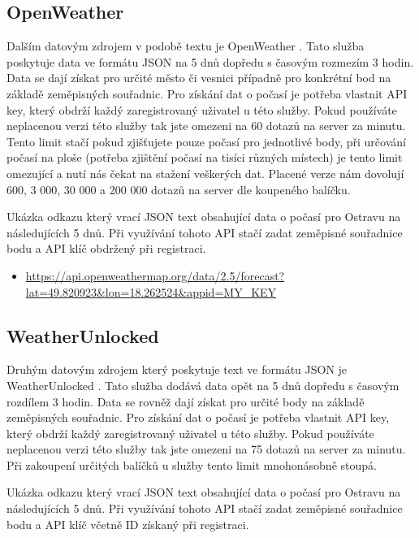 \documentclass[czech,bachelor,dept460,male,csharp,cpdeclaration]{diploma}
\begin{document}
	\subsection{OpenWeather}
	
	Dalším datovým zdrojem v podobě textu je OpenWeather \cite{owm}. Tato služba poskytuje data ve formátu JSON na 5 dnů dopředu s časovým rozmezím 3 hodin. Data se dají získat pro určité město či vesnici případně pro konkrétní bod na základě zeměpisných souřadnic. Pro získání dat o počasí je potřeba vlastnit API key, který obdrží každý zaregistrovaný uživatel u této služby. Pokud používáte neplacenou verzi této služby tak jste omezeni na 60 dotazů na server za minutu. Tento limit stačí pokud zjišťujete pouze počasí pro jednotlivé body, při určování počasí na ploše (potřeba zjištění počasí na tisíci různých místech) je tento limit omezující a nutí nás čekat na stažení veškerých dat. Placené verze nám dovolují 600, 3 000, 30 000 a 200 000 dotazů na server dle koupeného balíčku.
	
	Ukázka odkazu který vrací JSON text obsahující data o počasí pro Ostravu na následujících 5 dnů. Při využívání tohoto API stačí zadat zeměpisné souřadnice bodu a API klíč obdržený při registraci.
	
	\begin{itemize}
		\item \url{https://api.openweathermap.org/data/2.5/forecast?lat=49.820923\&lon=18.262524\&appid=MY\_KEY}
	\end{itemize}
	
	\subsection{WeatherUnlocked}
	
	Druhým datovým zdrojem který poskytuje text ve formátu JSON je WeatherUnlocked \cite{weun}. Tato služba dodává data opět na 5 dnů dopředu s časovým rozdílem 3 hodin. Data se rovněž dají získat pro určité body na základě zeměpisných souřadnic. Pro získání dat o počasí je potřeba vlastnit API key, který obdrží každý zaregistrovaný uživatel u této služby. Pokud používáte neplacenou verzi této služby tak jste omezeni na 75 dotazů na server za minutu. Při zakoupení určitých balíčků u služby tento limit mnohonásobně stoupá.
	
	Ukázka odkazu který vrací JSON text obsahující data o počasí pro Ostravu na následujících 5 dnů. Při využívání tohoto API stačí zadat zeměpisné souřadnice bodu a API klíč včetně ID získaný při registraci.
	
\end{document}
